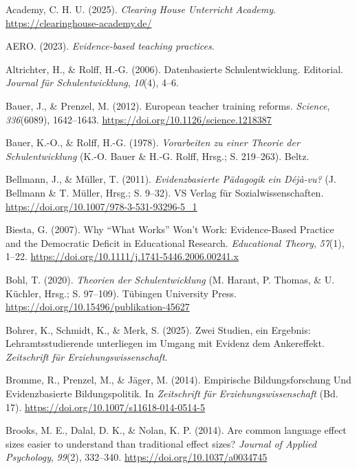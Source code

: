 \documentclass[
  jou,
  floatsintext,
  longtable,
  nolmodern,
  notxfonts,
  notimes,
  colorlinks=true,linkcolor=blue,citecolor=blue,urlcolor=blue]{apa7}
\newlength{\cslhangindent}
\newenvironment{CSLReferences}[2] %
 {\begin{list}{}{%
  \setlength{\itemindent}{0pt}
  \setlength{\leftmargin}{0pt}
  \setlength{\parsep}{0pt}
  \ifodd #1
   \setlength{\leftmargin}{\cslhangindent}
   \setlength{\itemindent}{-1\cslhangindent}
  \fi
  \setlength{\itemsep}{#2\baselineskip}}}
 {\end{list}}
\begin{document}
\label{refs}
\begin{CSLReferences}{1}{0}
Academy, C. H. U. (2025). \emph{Clearing House Unterricht Academy}.
\url{https://clearinghouse-academy.de/}

AERO. (2023). \emph{Evidence-based teaching practices}.

Altrichter, H., \& Rolff, H.-G. (2006). Datenbasierte Schulentwicklung.
Editorial. \emph{Journal für Schulentwicklung}, \emph{10}(4), 4--6.

Bauer, J., \& Prenzel, M. (2012). European teacher training reforms.
\emph{Science}, \emph{336}(6089), 1642--1643.
\url{https://doi.org/10.1126/science.1218387}

Bauer, K.-O., \& Rolff, H.-G. (1978). \emph{Vorarbeiten zu einer Theorie
der Schulentwicklung} (K.-O. Bauer \& H.-G. Rolff, Hrsg.; S. 219--263).
Beltz.

Bellmann, J., \& Müller, T. (2011). \emph{Evidenzbasierte Pädagogik
{\textendash} ein Déjà-vu?} (J. Bellmann \& T. Müller, Hrsg.; S. 9--32).
VS Verlag für Sozialwissenschaften.
\url{https://doi.org/10.1007/978-3-531-93296-5_1}

Biesta, G. (2007). Why {``}What Works{''} Won{'}t Work: Evidence-Based
Practice and the Democratic Deficit in Educational Research.
\emph{Educational Theory}, \emph{57}(1), 1--22.
\url{https://doi.org/10.1111/j.1741-5446.2006.00241.x}

Bohl, T. (2020). \emph{Theorien der Schulentwicklung} (M. Harant, P.
Thomas, \& U. Küchler, Hrsg.; S. 97--109). Tübingen University Press.
\url{https://doi.org/10.15496/publikation-45627}

Bohrer, K., Schmidt, K., \& Merk, S. (2025). Zwei Studien, ein Ergebnis:
Lehramtsstudierende unterliegen im Umgang mit Evidenz dem Ankereffekt.
\emph{Zeitschrift für Erziehungswissenschaft}.

Bromme, R., Prenzel, M., \& Jäger, M. (2014). Empirische
{Bildungsforschung} Und Evidenzbasierte {Bildungspolitik}. In
\emph{Zeitschrift für Erziehungswissenschaft} (Bd. 17).
\url{https://doi.org/10.1007/s11618-014-0514-5}

Brooks, M. E., Dalal, D. K., \& Nolan, K. P. (2014). Are common language
effect sizes easier to understand than traditional effect sizes?
\emph{Journal of Applied Psychology}, \emph{99}(2), 332--340.
\url{https://doi.org/10.1037/a0034745}


\end{CSLReferences}
\end{document}
